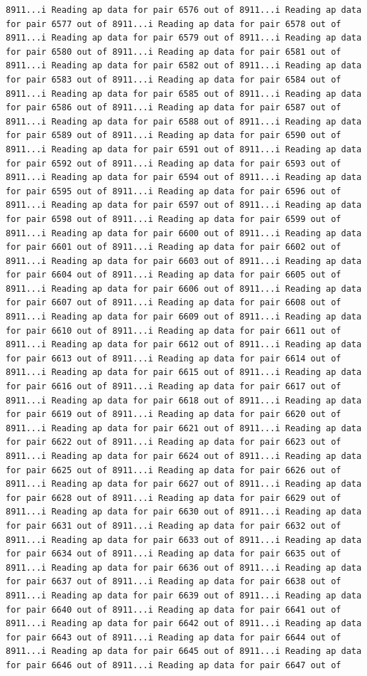 \documentclass[
]{article}
\begin{document}
\begin{verbatim}
8911...i Reading ap data for pair 6576 out of 8911...i Reading ap data for pair 6577 out of 8911...i Reading ap data for pair 6578 out of 8911...i Reading ap data for pair 6579 out of 8911...i Reading ap data for pair 6580 out of 8911...i Reading ap data for pair 6581 out of 8911...i Reading ap data for pair 6582 out of 8911...i Reading ap data for pair 6583 out of 8911...i Reading ap data for pair 6584 out of 8911...i Reading ap data for pair 6585 out of 8911...i Reading ap data for pair 6586 out of 8911...i Reading ap data for pair 6587 out of 8911...i Reading ap data for pair 6588 out of 8911...i Reading ap data for pair 6589 out of 8911...i Reading ap data for pair 6590 out of 8911...i Reading ap data for pair 6591 out of 8911...i Reading ap data for pair 6592 out of 8911...i Reading ap data for pair 6593 out of 8911...i Reading ap data for pair 6594 out of 8911...i Reading ap data for pair 6595 out of 8911...i Reading ap data for pair 6596 out of 8911...i Reading ap data for pair 6597 out of 8911...i Reading ap data for pair 6598 out of 8911...i Reading ap data for pair 6599 out of 8911...i Reading ap data for pair 6600 out of 8911...i Reading ap data for pair 6601 out of 8911...i Reading ap data for pair 6602 out of 8911...i Reading ap data for pair 6603 out of 8911...i Reading ap data for pair 6604 out of 8911...i Reading ap data for pair 6605 out of 8911...i Reading ap data for pair 6606 out of 8911...i Reading ap data for pair 6607 out of 8911...i Reading ap data for pair 6608 out of 8911...i Reading ap data for pair 6609 out of 8911...i Reading ap data for pair 6610 out of 8911...i Reading ap data for pair 6611 out of 8911...i Reading ap data for pair 6612 out of 8911...i Reading ap data for pair 6613 out of 8911...i Reading ap data for pair 6614 out of 8911...i Reading ap data for pair 6615 out of 8911...i Reading ap data for pair 6616 out of 8911...i Reading ap data for pair 6617 out of 8911...i Reading ap data for pair 6618 out of 8911...i Reading ap data for pair 6619 out of 8911...i Reading ap data for pair 6620 out of 8911...i Reading ap data for pair 6621 out of 8911...i Reading ap data for pair 6622 out of 8911...i Reading ap data for pair 6623 out of 8911...i Reading ap data for pair 6624 out of 8911...i Reading ap data for pair 6625 out of 8911...i Reading ap data for pair 6626 out of 8911...i Reading ap data for pair 6627 out of 8911...i Reading ap data for pair 6628 out of 8911...i Reading ap data for pair 6629 out of 8911...i Reading ap data for pair 6630 out of 8911...i Reading ap data for pair 6631 out of 8911...i Reading ap data for pair 6632 out of 8911...i Reading ap data for pair 6633 out of 8911...i Reading ap data for pair 6634 out of 8911...i Reading ap data for pair 6635 out of 8911...i Reading ap data for pair 6636 out of 8911...i Reading ap data for pair 6637 out of 8911...i Reading ap data for pair 6638 out of 8911...i Reading ap data for pair 6639 out of 8911...i Reading ap data for pair 6640 out of 8911...i Reading ap data for pair 6641 out of 8911...i Reading ap data for pair 6642 out of 8911...i Reading ap data for pair 6643 out of 8911...i Reading ap data for pair 6644 out of 8911...i Reading ap data for pair 6645 out of 8911...i Reading ap data for pair 6646 out of 8911...i Reading ap data for pair 6647 out of 
\end{verbatim}
\end{document}
